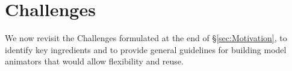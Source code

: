 \section{Challenges}
\label{sec:Challenges}

We now revisit the Challenges formulated at the end of \S \ref{sec:Motivation}, 
to identify key ingredients and to provide general guidelines for building 
model animators that would allow flexibility and reuse.





 